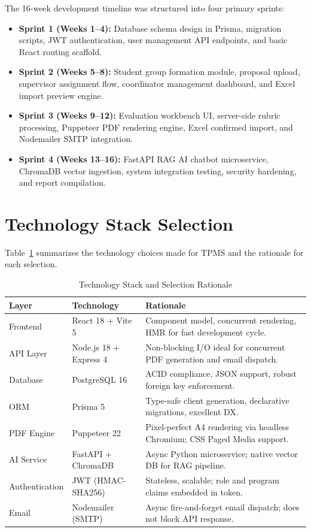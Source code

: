\documentclass[12pt]{report}
\begin{document}
The 16-week development timeline was structured into four primary sprints:

\begin{itemize}[leftmargin=*]
  \item \textbf{Sprint 1 (Weeks 1--4):} Database schema design in Prisma, migration scripts, JWT authentication, user management API endpoints, and basic React routing scaffold.
  \item \textbf{Sprint 2 (Weeks 5--8):} Student group formation module, proposal upload, supervisor assignment flow, coordinator management dashboard, and Excel import preview engine.
  \item \textbf{Sprint 3 (Weeks 9--12):} Evaluation workbench UI, server-side rubric processing, Puppeteer PDF rendering engine, Excel confirmed import, and Nodemailer SMTP integration.
  \item \textbf{Sprint 4 (Weeks 13--16):} FastAPI RAG AI chatbot microservice, ChromaDB vector ingestion, system integration testing, security hardening, and report compilation.
\end{itemize}

\section{Technology Stack Selection}

Table~\ref{tab:tech_stack} summarizes the technology choices made for TPMS and the rationale for each selection.

\begin{table}[H]
\centering
\caption{Technology Stack and Selection Rationale}\label{tab:tech_stack}
\begin{tabularx}{\textwidth}{l l X}
\toprule
\textbf{Layer} & \textbf{Technology} & \textbf{Rationale}\\
\midrule
Frontend & React 18 + Vite 5 & Component model, concurrent rendering, HMR for fast development cycle.\\
API Layer & Node.js 18 + Express 4 & Non-blocking I/O ideal for concurrent PDF generation and email dispatch.\\
Database & PostgreSQL 16 & ACID compliance, JSON support, robust foreign key enforcement.\\
ORM & Prisma 5 & Type-safe client generation, declarative migrations, excellent DX.\\
PDF Engine & Puppeteer 22 & Pixel-perfect A4 rendering via headless Chromium; CSS Paged Media support.\\
AI Service & FastAPI + ChromaDB & Async Python microservice; native vector DB for RAG pipeline.\\
Authentication & JWT (HMAC-SHA256) & Stateless, scalable; role and program claims embedded in token.\\
Email & Nodemailer (SMTP) & Async fire-and-forget email dispatch; does not block API response.\\
\bottomrule
\end{tabularx}
\end{table}
\end{document}
